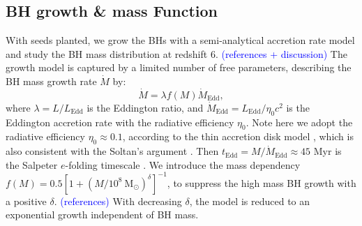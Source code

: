 \documentclass[nolinenumbers,preprint2,tighten]{aastex631}
\newcommand{\Msun}{\mathrm{M_\odot}}
\newcommand{\Mdot}{\dot{M}}
\newcommand{\tEdd}{t_\mathrm{Edd}}
\newcommand{\blue}[1]{\textcolor{blue}{ #1}}
\begin{document}
\begin{CJK*}{UTF8}{gbsn}
\subsection{BH growth \& mass Function}\label{sec:MF}
With seeds planted, we grow the BHs with a semi-analytical accretion rate model 
and study the BH mass distribution at redshift 6. 
\blue{(references + discussion)}
The growth model is captured by a limited number of free parameters, 
describing the BH mass growth rate $\Mdot$ by: 
\begin{equation}
  \label{eq:mdot}
  \Mdot = \lambda f\left(M\right) \Mdot_\mathrm{Edd} ,
\end{equation}
where $\lambda = L/L_\mathrm{Edd}$ is the Eddington ratio,
and $\Mdot_\mathrm{Edd} = L_{\mathrm{Edd}}/\eta_0 c^2$ is the Eddington accretion rate with the radiative efficiency $\eta_0$.
Note here we adopt the radiative efficiency $\eta_0 \approx 0.1 $,
according to the thin accretion disk model \citep{1973A&A....24..337S}, 
which is also consistent with the Soltan's argument \citep{1982MNRAS.200..115S,2002MNRAS.335..965Y}.
Then $\tEdd =  M/\Mdot_{\mathrm{Edd}} \approx 45$ Myr is the Salpeter $e$-folding timescale \citep{1964ApJ...140..796S}.
We introduce the mass dependency 
$f(M) = 0.5 \left[1+\left(M/10^8~\Msun\right)^\delta\right] ^ {-1}$, 
to suppress the high mass BH growth with a positive $\delta$. 
\blue{(references)}
With decreasing $\delta$, 
the model is reduced to an exponential growth independent of BH mass.


\end{CJK*}
\end{document}
